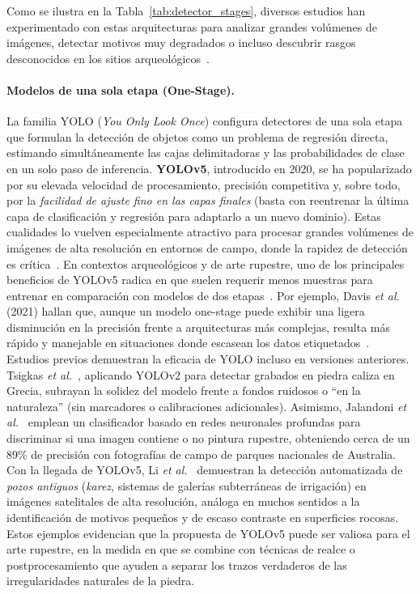 Como se ilustra en la Tabla~\ref{tab:detector_stages}, diversos estudios han experimentado con estas arquitecturas para analizar grandes volúmenes de imágenes, detectar motivos muy degradados o incluso descubrir rasgos desconocidos en los sitios arqueológicos~\cite{horn2022,jalandoni2022,suhaimi2023}.

\paragraph{Modelos de una sola etapa (One-Stage).}
La familia YOLO (\textit{You Only Look Once}) configura detectores de una sola etapa que formulan la detección de objetos como un problema de regresión directa, estimando simultáneamente las cajas delimitadoras y las probabilidades de clase en un solo paso de inferencia.
\textbf{YOLOv5}, introducido en 2020, se ha popularizado por su elevada velocidad de procesamiento, precisión competitiva y, sobre todo, por la \emph{facilidad de ajuste fino en las capas finales} (basta con reentrenar la última capa de clasificación y regresión para adaptarlo a un nuevo dominio).
Estas cualidades lo vuelven especialmente atractivo para procesar grandes volúmenes de imágenes de alta resolución en entornos de campo, donde la rapidez de detección es crítica~\cite{li2022}.
En contextos arqueológicos y de arte rupestre, uno de los principales beneficios de YOLOv5 radica en que suelen requerir menos muestras para entrenar en comparación con modelos de dos etapas~\cite{suhaimi2023}.
Por ejemplo, Davis \textit{et al.} (2021) hallan que, aunque un modelo one-stage puede exhibir una ligera disminución en la precisión frente a arquitecturas más complejas, resulta más rápido y manejable en situaciones donde escasean los datos etiquetados~\cite{davis2021}.
Estudios previos demuestran la eficacia de YOLO incluso en versiones anteriores.
Tsigkas \textit{et al.}~\cite{tsigkas2020}, aplicando YOLOv2 para detectar grabados en piedra caliza en Grecia, subrayan la solidez del modelo frente a fondos ruidosos o “en la naturaleza” (sin marcadores o calibraciones adicionales).
Asimismo, Jalandoni \textit{et al.}~\cite{jalandoni2022} emplean un clasificador basado en redes neuronales profundas para discriminar si una imagen contiene o no pintura rupestre, obteniendo cerca de un 89\% de precisión con fotografías de campo de parques nacionales de Australia.
Con la llegada de YOLOv5, Li \textit{et al.}~\cite{li2022} demuestran la detección automatizada de \emph{pozos antiguos} (\textit{karez}, sistemas de galerías subterráneas de irrigación) en imágenes satelitales de alta resolución, análoga en muchos sentidos a la identificación de motivos pequeños y de escaso contraste en superficies rocosas.
Estos ejemplos evidencian que la propuesta de YOLOv5 puede ser valiosa para el arte rupestre, en la medida en que se combine con técnicas de realce o postprocesamiento que ayuden a separar los trazos verdaderos de las irregularidades naturales de la piedra.

